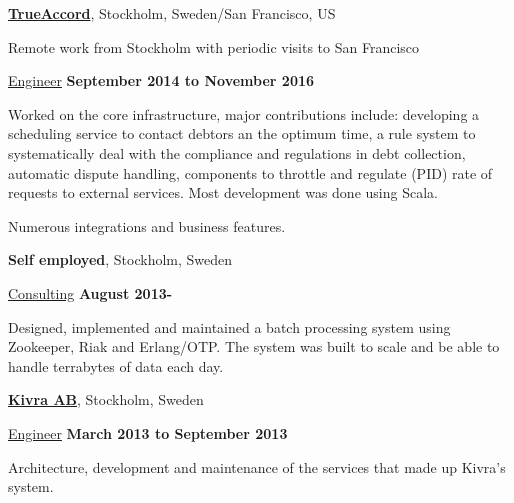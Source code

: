 \documentclass[10pt]{article}
\renewcommand\textit[1]{\underline{#1}}
\newcommand{\halfblankline}{\quad\vspace{-0.5\baselineskip}\pagebreak[3]}
\begin{document}
\halfblankline

\href{http://www.trueaccord.com/}{\textbf{TrueAccord}},
Stockholm, Sweden/San Francisco, US

Remote work from Stockholm with periodic visits to San Francisco
\begin{outerlist}
\item[] \textit{Engineer}
  \hfill \textbf{September 2014 to November 2016}
  \begin{innerlist}
  \item
      Worked on the core infrastructure, major contributions include:
      developing a scheduling service to contact debtors an the optimum time,
      a rule system to systematically deal with the compliance and regulations
      in debt collection, automatic dispute handling, components to throttle
      and regulate (PID) rate of requests to external services.
      Most development was done using Scala.
    \item
      Numerous integrations and business features.
  \end{innerlist}
\end{outerlist}

\halfblankline

\textbf{Self employed},
Stockholm, Sweden
\begin{outerlist}
\item[] \textit{Consulting}
  \hfill \textbf{August 2013-}
  \begin{innerlist}
    \item
      Designed, implemented and maintained a batch processing system using
      Zookeeper, Riak and Erlang/OTP. The system was built to scale and be
      able to handle terrabytes of data each day.
  \end{innerlist}
\end{outerlist}

\halfblankline

\href{http://www.kivra.se/}{\textbf{Kivra AB}},
Stockholm, Sweden
\begin{outerlist}
\item[] \textit{Engineer}
  \hfill \textbf{March 2013 to September 2013}
  \begin{innerlist}
    \item
      Architecture, development and maintenance of the services that made up
      Kivra's system.
  \end{innerlist}
\end{outerlist}

\halfblankline
\end{document}
